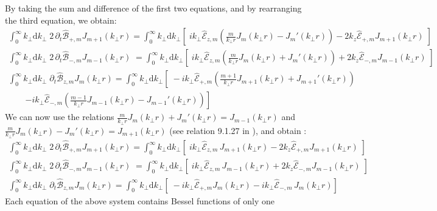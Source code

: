\documentclass[1p,times]{elsarticle}
\newcommand{\RInteg}[1]{\int_{0}^{\infty} \!\!\!\!\! #1\mathrm{d}#1}
\newcommand{\spectral}[1]{\hat{\mathcal{#1}}}
\begin{document}
By taking the sum and difference of the first two equations, and by
rearranging the third equation, we obtain:
\begin{subequations}
\begin{align}
\RInteg{k_\perp } \; 2 \,\partial_t \spectral{B}_{+,m}  J_{m+1}(k_\perp r) =
\RInteg{k_\perp } \left[ \; ik_\perp \spectral{E}_{z,m} \left( \frac{m}{k_\perp r} J_m(k_\perp r) -
    J_m'(k_\perp r) \right) -2 k_z\spectral{E}_{+,m}J_{m+1}(k_\perp r) \;
\right] \\
\RInteg{k_\perp } \; 2\, \partial_t \spectral{B}_{-,m}  J_{m-1}(k_\perp r) \; =
\RInteg{k_\perp } \left[ \;
   ik_\perp \spectral{E}_{z,m} \left( \frac{m}{k_\perp r} J_m(k_\perp r) +
    J_m'(k_\perp r) \right)  + 2k_z\spectral{E}_{-,m}J_{m-1}(k_\perp r) \;
\right] \\
\RInteg{k_\perp }\; \partial_t \spectral{B}_{z,m}  J_{m}(k_\perp r) =
\RInteg{k_\perp } \left[ \; -ik_\perp \spectral{E}_{+,m}\left(\frac{m+1}{k_\perp r}J_{m+1}(k_\perp r) +
    J_{m+1}'(k_\perp r) \right) \right.\nonumber \\
\qquad \left. - ik_\perp \spectral{E}_{-,m}\left(\frac{m-1}{k_\perp r}J_{m-1}(k_\perp r) -
    J_{m-1}'(k_\perp r) \right) \right] 
\end{align}
\end{subequations}
We can now use the relations $\frac{m}{k_\perp r} J_m(k_\perp r) +
    J_m'(k_\perp r) = J_{m-1}(k_\perp r)$ and $\frac{m}{k_\perp r} J_m(k_\perp r) -
    J_m'(k_\perp r) = J_{m+1}(k_\perp r)$ (see relation 9.1.27 in
    \cite{Abramowitz}), and obtain :
\begin{subequations}
\begin{align}
\RInteg{k_\perp } \; 2 \,\partial_t \spectral{B}_{+,m}  J_{m+1}(k_\perp r) =
\RInteg{k_\perp } \left[ \; ik_\perp \spectral{E}_{z,m}\,
    J_{m+1}(k_\perp r) -2 k_z\spectral{E}_{+,m}J_{m+1}(k_\perp r) \;
\right] \\
\RInteg{k_\perp } \; 2\, \partial_t \spectral{B}_{-,m}  J_{m-1}(k_\perp r) \; =
\RInteg{k_\perp } \left[ \;
   ik_\perp \spectral{E}_{z,m} \,
    J_{m-1}(k_\perp r) + 2k_z\spectral{E}_{-,m}J_{m-1}(k_\perp r) \;
\right] \\
\RInteg{k_\perp }\; \partial_t \spectral{B}_{z,m}  J_{m}(k_\perp r) =
\RInteg{k_\perp } \left[ \; -ik_\perp \spectral{E}_{+,m} J_{m}(k_\perp r) - ik_\perp \spectral{E}_{-,m}\,J_{m}(k_\perp r) \right] 
\end{align}
\end{subequations}
Each equation of the above system contains Bessel functions of only one
\end{document}
